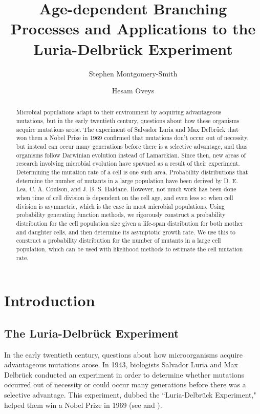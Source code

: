 \documentclass[12pt]{amsart}
\title[Branching Processes and the Luria-Delbr\"uck Experiment]{Age-dependent Branching Processes and Applications to the Luria-Delbr\"uck Experiment}
\author{Stephen Montgomery-Smith}
\author{Hesam Oveys}
\theoremstyle{plain}
\theoremstyle{definition}
\theoremstyle{remark}
\theoremstyle{definition}
\begin{document}
\begin{abstract}
Microbial populations adapt to their environment by acquiring advantageous mutations, but in the early twentieth century, questions about how these organisms acquire mutations arose. The experiment of Salvador Luria and Max Delbr\"uck that won them a Nobel Prize in 1969 confirmed that mutations don't occur out of necessity, but instead can occur many generations before there is a selective advantage, and thus organisms follow Darwinian evolution instead of Lamarckian. Since then, new areas of research involving microbial evolution have spawned as a result of their experiment. Determining the mutation rate of a cell is one such area. Probability distributions that determine the number of mutants in a large population have been derived by D. E. Lea, C. A. Coulson, and J. B. S. Haldane. However, not much work has been done when time of cell division is dependent on the cell age, and even less so when cell division is asymmetric, which is the case in most microbial populations. Using probability generating function methods, we rigorously construct a probability distribution for the cell population size given a life-span distribution for both mother and daughter cells, and then determine its asymptotic growth rate. We use this to construct a probability distribution for the number of mutants in a large cell population, which can be used with likelihood methods to estimate the cell mutation rate.
\end{abstract}

\maketitle

\section{Introduction}

\subsection{The Luria-Delbr\"uck Experiment}

In the early twentieth century, questions about how microorganisms acquire advantageous mutations arose. In 1943, biologists Salvador Luria and Max Delbr\"uck conducted an experiment in order to determine whether mutations occurred out of necessity or could occur many generations before there was a selective advantage. This experiment, dubbed the ``Luria-Delbr\"uck Experiment," helped them win a Nobel Prize in 1969 (see \cite{luriaDelbruck} and \cite{g-smith-et-al}).
\end{document}
